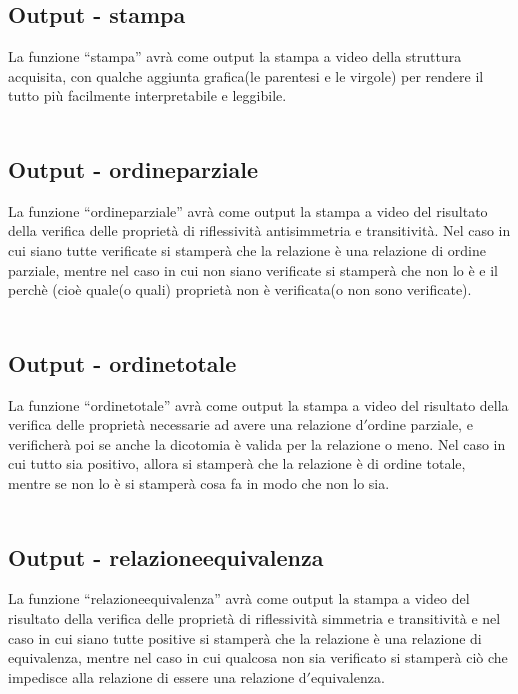 \documentclass[11pt, a4paper, titlepage, block]{article}
\begin{document}
	\subsection{Output - stampa}
	La funzione “stampa” avr\`a  come output la stampa a video della struttura acquisita, con qualche aggiunta grafica(le parentesi e le virgole) per rendere il tutto pi\`u facilmente interpretabile e leggibile.\\
	\\
	\subsection{Output - ordine\textunderscore parziale}
	La funzione “ordine\textunderscore parziale” avr\`a  come output la stampa a video del risultato della verifica delle propriet\`a  di riflessivit\`a  antisimmetria e transitivit\`a. Nel caso in cui siano tutte verificate si stamper\`a  che la relazione \`e  una relazione di ordine parziale, mentre nel caso in cui non siano verificate si stamper\`a  che non lo \`e  e il perch\`e  (cio\`e  quale(o quali) propriet\`a  non \`e  verificata(o non sono verificate).\\
	\\
	\subsection{Output - ordine\textunderscore totale}
	La funzione “ordine\textunderscore totale” avr\`a  come output la stampa a video del risultato della verifica delle propriet\`a  necessarie ad avere una relazione d$'$ordine parziale, e verificher\`a  poi se anche la dicotomia \`e valida per la relazione o meno. Nel caso in cui tutto sia positivo, allora si stamper\`a  che la relazione \`e  di ordine totale, mentre se non lo \`e  si stamper\`a  cosa fa in modo che non lo sia.\\
	\\
	\subsection{Output - relazione\textunderscore equivalenza}
	La funzione “relazione\textunderscore equivalenza” avr\`a  come output la stampa a video del risultato della verifica delle propriet\`a  di riflessivit\`a  simmetria e transitivit\`a e nel caso in cui siano tutte positive si stamper\`a  che la relazione \`e  una relazione di equivalenza, mentre nel caso in cui qualcosa non sia verificato si stamper\`a ci\`o  che impedisce alla relazione di essere una relazione d$'$equivalenza.\\
	\\
\end{document}
